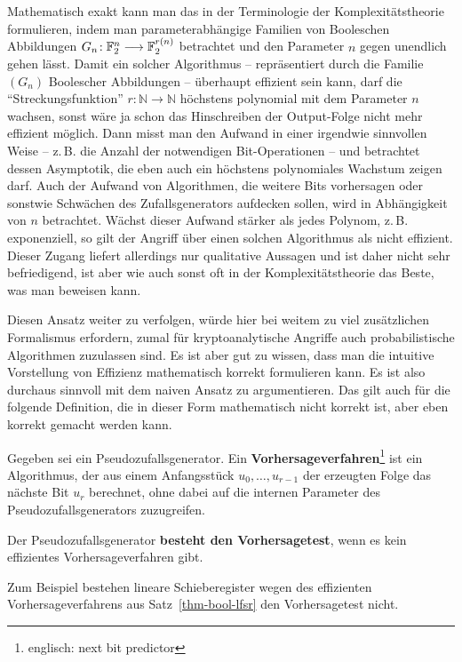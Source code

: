 \begin{refsegment}
Mathematisch exakt kann man das in der Terminologie der
Komplexitätstheorie
formulieren, indem man parameterabhängige Familien
von Booleschen Abbildungen
\mbox{$G_n\!: \mathbb{F}_2^n \longrightarrow \mathbb{F}_2^{r(n)}$} betrachtet und den
Parameter $n$ gegen unendlich gehen lässt. Damit ein solcher
Algorithmus -- repräsentiert durch die Familie $(G_n)$ Boolescher
Abbildungen -- überhaupt effizient sein kann, darf die "`Streckungsfunktion"'
$r\!: \mathbb{N} \longrightarrow \mathbb{N}$ höchstens polynomial mit dem Parameter
$n$ wachsen, sonst wäre ja schon das Hinschreiben der Output-Folge
nicht mehr effizient möglich. Dann misst man den
Aufwand in einer irgendwie sinnvollen Weise -- z.\,B. die Anzahl der
notwendigen Bit-Operationen -- und betrachtet dessen Asymptotik,
die eben auch ein höchstens polynomiales Wachstum zeigen darf.
Auch der Aufwand von Algorithmen, die weitere Bits vorhersagen
oder sonstwie Schwächen des Zufallsgenerators aufdecken sollen,
wird in Abhängigkeit von $n$ betrachtet. Wächst dieser Aufwand
stärker als jedes Polynom, z.\,B. exponenziell, so gilt der
Angriff über einen solchen Algorithmus als nicht effizient.
Dieser Zugang liefert allerdings nur qualitative Aussagen und
ist daher nicht sehr befriedigend, ist aber wie auch sonst oft
in der Komplexitätstheorie das Beste, was man beweisen kann.

Diesen Ansatz weiter zu verfolgen, würde hier bei weitem zu viel
zusätzlichen Formalismus erfordern, zumal für kryptoanalytische
Angriffe auch probabilistische Algorithmen zuzulassen sind.
Es ist aber gut zu wissen,
dass man die intuitive Vorstellung von Effizienz mathematisch
korrekt formulieren kann. Es ist also durchaus sinnvoll mit dem
naiven Ansatz zu argumentieren. Das gilt auch für die folgende
Definition, die in dieser Form mathematisch nicht korrekt ist,
aber eben korrekt gemacht werden kann.

\begin{definition}\label{def-bool-prg-pred}
  Gegeben sei ein Pseudozufallsgenerator.
  Ein \textbf{ Vorhersageverfahren}\footnote{%
    englisch: next bit predictor
  } ist ein Algorithmus, der aus einem
  Anfangsstück $u_0, \ldots, u_{r-1}$ der erzeugten Folge das nächste
  Bit $u_r$ berechnet, ohne dabei auf die internen Parameter des
  Pseudozufallsgenerators zuzugreifen.

  Der Pseudozufallsgenerator \textbf{besteht den
  Vorhersagetest}, wenn
  es kein effizientes Vorhersageverfahren gibt.
\end{definition}
Zum Beispiel bestehen
lineare Schieberegister
wegen des effizienten
Vorhersageverfahrens aus Satz~\ref{thm-bool-lfsr} den Vorhersagetest nicht.


\end{refsegment}
